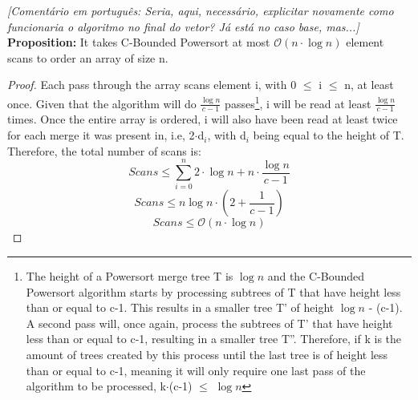 \documentclass{article}
\newcommand{\bigO}{\mathcal{O}}
\begin{document}
\textit{[Comentário em português: Seria, aqui, necessário, explicitar novamente como funcionaria o algoritmo no final do vetor? Já está no caso base, mas...]}
\newpage
\textbf{Proposition:} It takes C-Bounded Powersort at most $\bigO(n \cdot \log{n})$ element scans to order an array of size n. 
\begin{proof}
Each pass through the array scans element i, with 0 $\leq$ i $\leq$ n, at least once. Given that the algorithm will do $\frac{\log{n}}{c-1}$ passes\footnote{The height of a Powersort merge tree T is $\log n$ and the C-Bounded Powersort
algorithm starts by processing subtrees of T that have height less than or equal to c-1. This results in a smaller tree T' of height $\log n$ - (c-1). A second pass will, once again, process the subtrees of T' that have height less than or equal to c-1, resulting in a smaller tree T''. Therefore, if k is the amount of trees
created by this process until the last tree is of height less than or equal to c-1, meaning it will only require one last pass of the algorithm to be processed, k$\cdot$(c-1) $\leq$ $\log n$}, i will be read
at least $\frac{\log{n}}{c-1}$ times. Once the entire array is ordered, i will also have been read at least twice for each merge it was present in, i.e, 2$\cdot$d$_i$, with d$_i$ being equal to the height of T. Therefore,
the total number of scans is:
\begin{equation}
Scans \leq \sum^{n}_{i=0}2\cdot \log{n} + n \cdot \frac{\log{n}}{c-1}
\end{equation}
\begin{equation}
Scans \leq n\log{n}\cdot(2 + \frac{1}{c-1})
\end{equation}
\begin{equation}
Scans \leq \bigO(n \cdot \log{n})
\end{equation}
\end{proof} 
\end{document}
